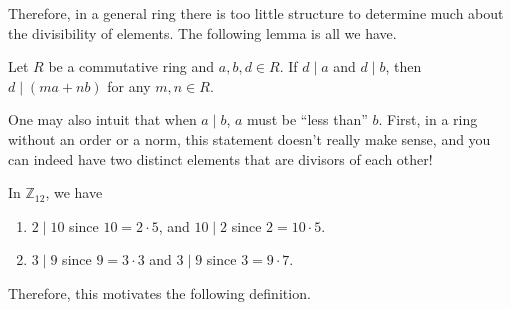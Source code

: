   Therefore, in a general ring there is too little structure to determine much about the divisibility of elements. The following lemma is all we have. 

  \begin{lemma}
    Let $R$ be a commutative ring and $a, b, d \in R$. If $d \mid a$ and $d \mid b$, then $d \mid (ma + nb)$ for any $m, n \in R$. 
  \end{lemma} 

  One may also intuit that when $a \mid b$, $a$ must be ``less than'' $b$. First, in a ring without an order or a norm, this statement doesn't really make sense, and you can indeed have two distinct elements that are divisors of each other! 

  \begin{example}
    In $\mathbb{Z}_{12}$, we have 
    \begin{enumerate}
      \item $2 \mid 10$ since $10 = 2 \cdot 5$, and $10 \mid 2$ since $2 = 10 \cdot 5$. 
      \item $3 \mid 9$ since $9 = 3 \cdot 3$ and $3 \mid 9$ since $3 = 9 \cdot 7$. 
    \end{enumerate}
  \end{example}

  Therefore, this motivates the following definition. 

